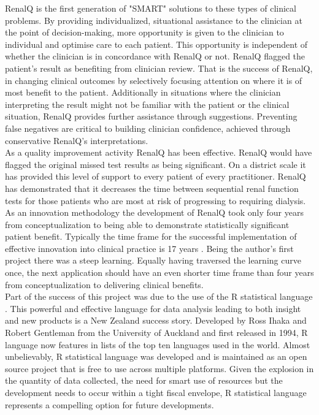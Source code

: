 \documentclass[11pt]{article}
\begin{document}
RenalQ is the first generation of "SMART" solutions to these types of clinical problems. By providing individualized, situational assistance to the clinician at the point of decision-making, more opportunity is given to the clinician to individual and optimise care to each patient. This opportunity is independent of whether the clinician is in concordance with RenalQ or not. RenalQ flagged the patient's result as benefiting from clinician review. That is the success of RenalQ,  in changing clinical outcomes by selectively focusing attention on where it is of most benefit to the patient.  Additionally in situations where the clinician interpreting the result might not be familiar with the patient or the clinical situation, RenalQ provides further assistance through suggestions. Preventing false negatives are critical to building clinician confidence, achieved through conservative RenalQ's interpretations. \\ 

As a quality improvement activity RenalQ has been effective. RenalQ would have flagged the original missed test results as being significant. On a district scale it has provided this level of support to every patient of every practitioner. RenalQ has demonstrated that it decreases the time between sequential renal function tests for those patients who are most at risk of progressing to requiring dialysis. \\

As an innovation methodology the development of RenalQ took only four years from conceptualization to being able to demonstrate statistically significant patient benefit. Typically the time frame for the successful implementation of effective innovation into clinical practice is 17 years \citep{morris2011answer}. Being the author's first project there was a steep learning. Equally having traversed the learning curve once, the next application should have an even shorter time frame than four years from conceptualization to delivering clinical benefits. \\

Part of the success of this project was due to the use of the R statistical language \citep{rstat2013}. This powerful and effective language for data analysis leading to both insight and new products is a New Zealand success story. Developed by Ross Ihaka and Robert Gentleman from the University of Auckland and first released in 1994, R language now features in lists of the top ten languages used in the world. Almost unbelievably, R statistical language was developed and is maintained as an open source project that is free to use across multiple platforms. Given the explosion in the quantity of data collected, the need for smart use of resources but the development needs to occur within a tight fiscal envelope, R statistical language represents a compelling option for future developments. \\





\end{document}

